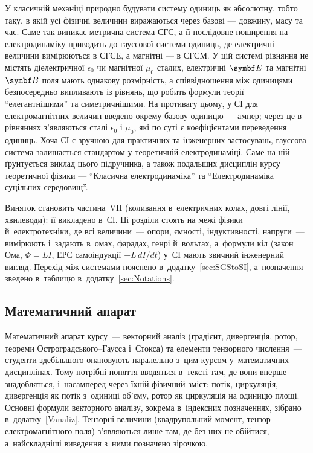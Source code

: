 У класичній механіці природно будувати систему одиниць як абсолютну, тобто таку, в якій
усі фізичні величини виражаються через базові --- довжину, масу та час. Саме так виникає
метрична система СГС, а її послідовне поширення на електродинаміку приводить до гауссової
системи одиниць, де електричні величини вимірюються в СГСЕ, а магнітні --- в СГСМ. У цій
системі рівняння не містять діелектричної \( \epsilon_{0}\) чи магнітної \( \mu_{0} \)
сталих, електричні \( \Efield \) та магнітні \( \Bfield \) поля мають однакову
розмірність, а співвідношення між одиницями безпосередньо випливають із рівнянь, що робить
формули теорії \enquote{елегантнішими} та симетричнішими. На противагу цьому, у СІ для
електромагнітних величин введено окрему базову одиницю --- ампер; через це в рівняннях
з'являються сталі \( \epsilon_{0} \) і \( \mu_{0} \), які по суті є коефіцієнтами
переведення одиниць. Хоча СІ є зручною для практичних та інженерних застосувань, гауссова
система залишається стандартом у теоретичній електродинаміці. Саме на ній ґрунтується
виклад цього підручника, а також подальших дисциплін курсу теоретичної фізики ---
\enquote{Класична електродинаміка} та \enquote{Електродинаміка суцільних середовищ}.

Виняток становить частина~VII (коливання в~електричних колах, довгі лінії, хвилеводи): її
викладено в~СІ. Ці розділи стоять на межі фізики й~електротехніки, де всі величини~---
опори, ємності, індуктивності, напруги~--- вимірюють і~задають в~омах, фарадах, генрі
й~вольтах, а~формули кіл (закон Ома, $\Phi=LI$, ЕРС самоіндукції $-L\,dI/dt$) у~СІ мають
звичний інженерний вигляд. Перехід між системами пояснено в~додатку~\ref{sec:SGStoSI},
а~позначення зведено в~таблицю в~додатку~\ref{sec:Notations}.

\subsection*{Математичний апарат}

Математичний апарат курсу~--- векторний аналіз (градієнт, дивергенція, ротор, теореми
Остроградського--Гаусса і~Стокса) та елементи тензорного числення~--- студенти здебільшого
опановують паралельно з~цим курсом у~математичних дисциплінах. Тому потрібні поняття
вводяться в~тексті там, де вони вперше знадобляться, і~насамперед через їхній фізичний
зміст: потік, циркуляція, дивергенція як потік з~одиниці об'єму, ротор як циркуляція на
одиницю площі. Основні формули векторного аналізу, зокрема в~індексних позначеннях,
зібрано в~додатку~\ref{Vanaliz}. Тензорні величини (квадрупольний момент, тензор
електромагнітного поля) з'являються лише там, де без них не обійтися, а~найскладніші
виведення з~ними позначено зірочкою.

